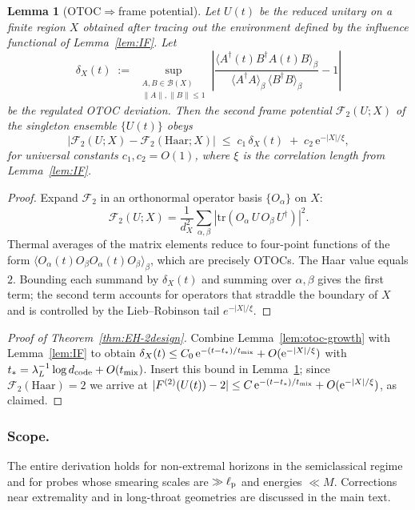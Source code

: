 \documentclass[aps,prd,preprint,onecolumn,superscriptaddress,nofootinbib,longbibliography,floatfix,11pt,showpacs,showkeys]{revtex4-2}
\theoremstyle{plain}
\newtheorem{lemma}[theorem]{Lemma}
\theoremstyle{definition}
\theoremstyle{remark}
\begin{document}
\begin{lemma}[OTOC$\Rightarrow$frame potential]
\label{lem:otoc-to-fp}
Let $U(t)$ be the reduced unitary on a finite region $X$ obtained after tracing out the environment defined by the influence functional of Lemma~\ref{lem:IF}.
Let
\[
\delta_X(t)\;:=\;\sup_{\substack{A,B\in\mathcal{B}(X)\\ \|A\|,\|B\|\le 1}}\left|\frac{\langle A^\dagger(t)B^\dagger A(t)B\rangle_\beta}{\langle A^\dagger A\rangle_\beta\,\langle B^\dagger B\rangle_\beta}-1\right|
\]
be the regulated OTOC deviation.
Then the second frame potential $\mathcal{F}_2(U;X)$ of the singleton ensemble $\{U(t)\}$ obeys
\[
\big|\mathcal{F}_2(U;X)-\mathcal{F}_2(\mathrm{Haar};X)\big|\;\le\; c_1\,\delta_X(t)\;+\;c_2\,\mathrm{e}^{-|X|/\xi},
\]
for universal constants $c_1,c_2=O(1)$, where $\xi$ is the correlation length from Lemma~\ref{lem:IF}.
\end{lemma}
\begin{proof}
Expand $\mathcal{F}_2$ in an orthonormal operator basis $\{O_\alpha\}$ on $X$:
\[
\mathcal{F}_2(U;X)=\frac{1}{d_X^2}\sum_{\alpha,\beta} |\mathrm{tr}(O_\alpha\,U\,O_\beta\,U^\dagger)|^2.
\]
Thermal averages of the matrix elements reduce to four-point functions of the form $\langle O_\alpha(t)O_\beta O_\alpha(t)O_\beta\rangle_\beta$, which are precisely OTOCs.
The Haar value equals $2$.
Bounding each summand by $\delta_X(t)$ and summing over $\alpha,\beta$ gives the first term; the second term accounts for operators that straddle the boundary of $X$ and is controlled by the Lieb--Robinson tail $e^{-|X|/\xi}$.
\end{proof}

\begin{proof}[Proof of Theorem~\ref{thm:EH-2design}]
Combine Lemma~\ref{lem:otoc-growth} with Lemma~\ref{lem:IF} to obtain
$\delta_X(t)\le C_0\,\mathrm{e}^{-(t-t_\ast)/t_{\rm mix}}+O(\mathrm{e}^{-|X|/\xi})$ with $t_\ast=\lambda_L^{-1}\log d_{\rm code}+O(t_{\rm mix})$.
Insert this bound in Lemma~\ref{lem:otoc-to-fp}; since $\mathcal{F}_2(\mathrm{Haar})=2$ we arrive at
$|F^{(2)}(U(t))-2|\le C\,\mathrm{e}^{-(t-t_\ast)/t_{\rm mix}}+O(\mathrm{e}^{-|X|/\xi})$, as claimed.
\end{proof}

\subsubsection{Scope.}
The entire derivation holds for non-extremal horizons in the semiclassical regime and for probes whose smearing scales are $\gg\ell_{\rm p}$ and energies $\ll M$.
Corrections near extremality and in long-throat geometries are discussed in the main text.
\end{document}
